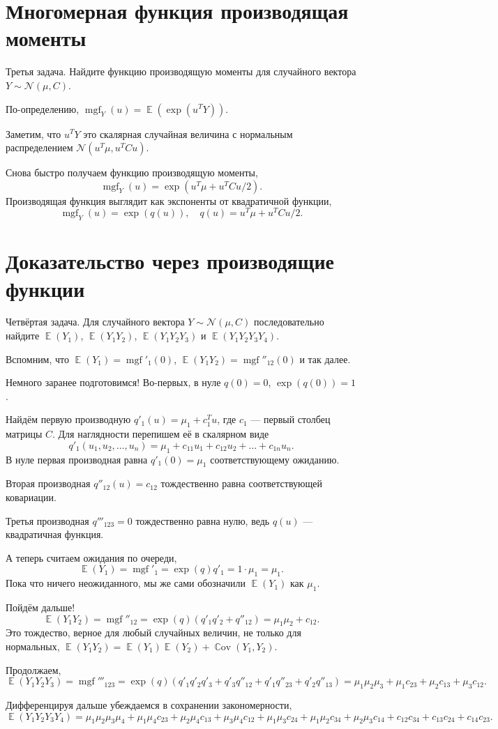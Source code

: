 \documentclass[12pt]{article}
\DeclareMathOperator{\Cov}{\mathbb{C}ov}
\DeclareMathOperator{\E}{\mathbb{E}}
\DeclareMathOperator{\mgf}{mgf}
\newcommand{\cN}{\mathcal{N}}
\begin{document}
\section*{Многомерная функция производящая моменты}
Третья задача. 
Найдите функцию производящую моменты для случайного вектора $Y \sim \cN(\mu, C)$.

По-определению, $\mgf_Y(u) = \E(\exp(u^T Y))$.

Заметим, что $u^T Y$ это скалярная случайная величина с нормальным распределением $\cN(u^T \mu, u^T C u)$.

Снова быстро получаем функцию производящую моменты, 
\[
\mgf_Y(u) = \exp(u^T\mu + u^T C u/2).
\]
Производящая функция выглядит как экспоненты от квадратичной функции,
\[
\mgf_Y(u) = \exp(q(u)), \quad q(u) = u^T\mu + u^T C u/2.
\]

\section*{Доказательство через производящие функции}
Четвёртая задача. 
Для случайного вектора $Y \sim \cN(\mu, C)$ последовательно найдите $\E(Y_1)$, $\E(Y_1 Y_2)$, $\E(Y_1 Y_2 Y_3)$ и $\E(Y_1 Y_2 Y_3 Y_4)$.

Вспомним, что $\E(Y_1) = \mgf'_1(0)$, $\E(Y_1 Y_2) = \mgf''_{12}(0)$ и так далее. 

Немного заранее подготовимся! Во-первых, в нуле $q(0) = 0$, $\exp(q(0)) = 1$.

Найдём первую производную $q'_1(u) = \mu_1 + c_1^T u$, где $c_1$ — первый столбец матрицы $C$.
Для наглядности перепишем её в скалярном виде
\[
    q'_1(u_1, u_2, \dots, u_n) = \mu_1 + c_{11}u_1 + c_{12}u_2 + \dots + c_{1n}u_n.
\]
В нуле первая производная равна $q'_1(0) = \mu_1$ соответствующему ожиданию. 

Вторая производная $q''_{12}(u) = c_{12}$ тождественно равна соответствующей ковариации. 

Третья производная $q'''_{123} = 0$  тождественно равна нулю, ведь $q(u)$ — квадратичная функция.

А теперь считаем ожидания по очереди,
\[
    \E(Y_1) = \mgf'_1 = \exp(q) q'_1 = 1 \cdot \mu_1 = \mu_1.
\]
Пока что ничего неожиданного, мы же сами обозначили $\E(Y_1)$ как $\mu_1$.

Пойдём дальше!
\[
    \E(Y_1Y_2) = \mgf''_{12} = \exp(q) (q'_1q'_2 + q''_{12}) = \mu_1 \mu_2 + c_{12}.
\]
Это тождество, верное для любый случайных величин, не только для нормальных, $\E(Y_1 Y_2) = \E(Y_1) \E(Y_2) + \Cov(Y_1, Y_2)$.

Продолжаем,
\[
    \E(Y_1 Y_2 Y_3) = \mgf'''_{123} = \exp(q) (q'_1 q'_2 q'_3 + q'_3 q''_{12} + q'_1 q''_{23} + q'_2 q''_{13}) = \mu_1 \mu_2\mu_3 + \mu_1 c_{23} + \mu_2 c_{13} + \mu_3 c_{12}.
\]

Дифференцируя дальше убеждаемся в сохранении закономерности, 
\[
    \E(Y_1 Y_2 Y_3 Y_4) = \mu_1 \mu_2\mu_3 \mu_4 + \mu_1 \mu_4 c_{23} + \mu_2 \mu_4 c_{13} + \mu_3 \mu_4 c_{12} + \mu_1 \mu_3 c_{24} + \mu_1 \mu_2 c_{34} + \mu_2 \mu_3 c_{14} +  c_{12}c_{34} + c_{13}c_{24} + c_{14}c_{23}.
\]
\end{document}
